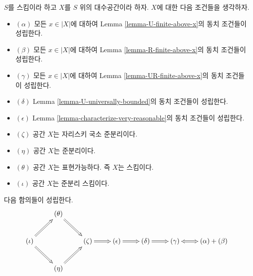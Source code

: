 \begin{lemma}
\label{lemma-bounded-fibres}
$S$를 스킴이라 하고 $X$를 $S$ 위의 대수공간이라 하자.
$X$에 대한 다음 조건들을 생각하자.
\begin{itemize}
\item[] $(\alpha)$ 모든 $x \in |X|$에 대하여 Lemma
\ref{lemma-U-finite-above-x}의 동치 조건들이 성립한다.
\item[] $(\beta)$ 모든 $x \in |X|$에 대하여 Lemma
\ref{lemma-R-finite-above-x}의 동치 조건들이 성립한다.
\item[] $(\gamma)$ 모든 $x \in |X|$에 대하여 Lemma
\ref{lemma-UR-finite-above-x}의 동치 조건들이 성립한다.
\item[] $(\delta)$ Lemma \ref{lemma-U-universally-bounded}의 동치
조건들이 성립한다.
\item[] $(\epsilon)$ Lemma \ref{lemma-characterize-very-reasonable}의
동치 조건들이 성립한다.
\item[] $(\zeta)$ 공간 $X$는 자리스키 국소 준분리이다.
\item[] $(\eta)$ 공간 $X$는 준분리이다.
\item[] $(\theta)$ 공간 $X$는 표현가능하다. 즉 $X$는 스킴이다.
\item[] $(\iota)$ 공간 $X$는 준분리 스킴이다.
\end{itemize}
다음 함의들이 성립한다.
$$
\xymatrix{
& (\theta) \ar@{=>}[rd] & & & &  \\
(\iota) \ar@{=>}[ru] \ar@{=>}[rd] & &
(\zeta) \ar@{=>}[r] &
(\epsilon) \ar@{=>}[r] &
(\delta) \ar@{=>}[r] &
(\gamma) \ar@{<=>}[r] & (\alpha) + (\beta) \\
& (\eta) \ar@{=>}[ru] & & & &
}
$$
\end{lemma}

